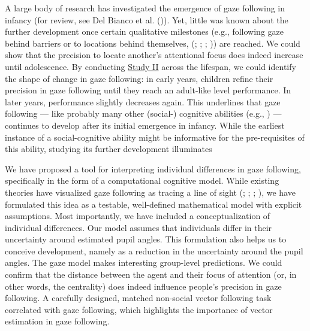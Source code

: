 \documentclass[
]{scrbook}
\begin{document}
A large body of research has investigated the emergence of gaze following in infancy (for review, see Del Bianco et al. ()). Yet, little was known about the further development once certain qualitative milestones (e.g., following gaze behind barriers or to locations behind themselves, (; ; ; )) are reached. We could show that the precision to locate another's attentional focus does indeed increase until adolescence. By conducting \hyperref[studyII]{Study II} across the lifespan, we could identify the shape of change in gaze following: in early years, children refine their precision in gaze following until they reach an adult-like level performance. In later years, performance slightly decreases again. This underlines that gaze following --- like probably many other (social-) cognitive abilities (e.g., ) --- continues to develop after its initial emergence in infancy. While the earliest instance of a social-cognitive ability might be informative for the pre-requisites of this ability, studying its further development illuminates

We have proposed a tool for interpreting individual differences in gaze following, specifically in the form of a computational cognitive model. While existing theories have visualized gaze following as tracing a line of sight (; ; ; ), we have formulated this idea as a testable, well-defined mathematical model with explicit assumptions. Most importantly, we have included a conceptualization of individual differences. Our model assumes that individuals differ in their uncertainty around estimated pupil angles. This formulation also helps us to conceive development, namely as a reduction in the uncertainty around the pupil angles. The gaze model makes interesting group-level predictions. We could confirm that the distance between the agent and their focus of attention (or, in other words, the centrality) does indeed influence people's precision in gaze following. A carefully designed, matched non-social vector following task correlated with gaze following, which highlights the importance of vector estimation in gaze following.
\end{document}
